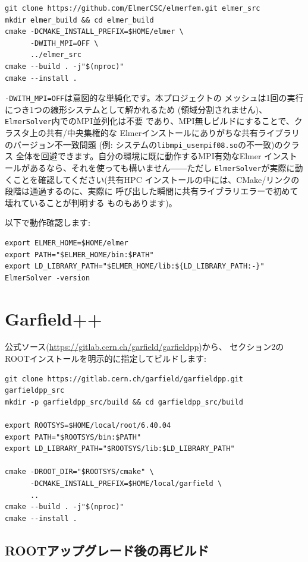 \documentclass[11pt]{ltjsarticle}
\begin{document}
\begin{lstlisting}
git clone https://github.com/ElmerCSC/elmerfem.git elmer_src
mkdir elmer_build && cd elmer_build
cmake -DCMAKE_INSTALL_PREFIX=$HOME/elmer \
      -DWITH_MPI=OFF \
      ../elmer_src
cmake --build . -j"$(nproc)"
cmake --install .
\end{lstlisting}

\texttt{-DWITH\_MPI=OFF}は意図的な単純化です。本プロジェクトの
メッシュは1回の実行につき1つの線形システムとして解かれるため
(領域分割されません)、\texttt{ElmerSolver}内でのMPI並列化は不要
であり、MPI無しビルドにすることで、クラスタ上の共有/中央集権的な
Elmerインストールにありがちな共有ライブラリのバージョン不一致問題
(例: システムの\texttt{libmpi\_usempif08.so}の不一致)のクラス
全体を回避できます。自分の環境に既に動作するMPI有効なElmer
インストールがあるなら、それを使っても構いません――ただし
\texttt{ElmerSolver}が実際に動くことを確認してください(共有HPC
インストールの中には、CMake/リンクの段階は通過するのに、実際に
呼び出した瞬間に共有ライブラリエラーで初めて壊れていることが判明する
ものもあります)。

以下で動作確認します:
\begin{lstlisting}
export ELMER_HOME=$HOME/elmer
export PATH="$ELMER_HOME/bin:$PATH"
export LD_LIBRARY_PATH="$ELMER_HOME/lib:${LD_LIBRARY_PATH:-}"
ElmerSolver -version
\end{lstlisting}

\section{Garfield++}

公式ソース(\url{https://gitlab.cern.ch/garfield/garfieldpp})から、
セクション2のROOTインストールを明示的に指定してビルドします:

\begin{lstlisting}
git clone https://gitlab.cern.ch/garfield/garfieldpp.git garfieldpp_src
mkdir -p garfieldpp_src/build && cd garfieldpp_src/build

export ROOTSYS=$HOME/local/root/6.40.04
export PATH="$ROOTSYS/bin:$PATH"
export LD_LIBRARY_PATH="$ROOTSYS/lib:$LD_LIBRARY_PATH"

cmake -DROOT_DIR="$ROOTSYS/cmake" \
      -DCMAKE_INSTALL_PREFIX=$HOME/local/garfield \
      ..
cmake --build . -j"$(nproc)"
cmake --install .
\end{lstlisting}

\subsection{ROOTアップグレード後の再ビルド}
\end{document}
